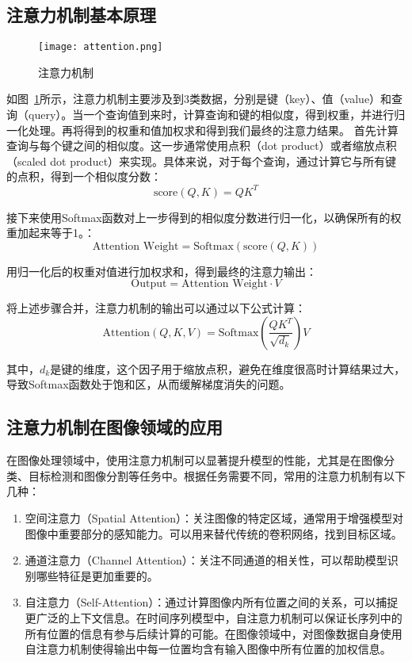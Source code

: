 \subsection{注意力机制基本原理}

\begin{figure}[h]
  \centering
  \texttt{[image: attention.png]}
  \caption{注意力机制}
  \label{fig:attention}
\end{figure}

如图~\ref{fig:attention}所示，注意力机制主要涉及到3类数据，分别是键（key）、值（value）和查询（query）。当一个查询值到来时，计算查询和键的相似度，得到权重，并进行归一化处理。再将得到的权重和值加权求和得到我们最终的注意力结果。
首先计算查询与每个键之间的相似度。这一步通常使用点积（dot product）或者缩放点积（scaled dot product）来实现。具体来说，对于每个查询，通过计算它与所有键的点积，得到一个相似度分数：
\begin{equation}
  \text{score}(Q, K) = QK^T 
\end{equation}

接下来使用Softmax函数对上一步得到的相似度分数进行归一化，以确保所有的权重加起来等于1。：
\begin{equation}
   \text{Attention Weight} = \text{Softmax}(\text{score}(Q, K))
\end{equation}

用归一化后的权重对值进行加权求和，得到最终的注意力输出：
\begin{equation}
  \text{Output} = \text{Attention Weight} \cdot V 
\end{equation}

将上述步骤合并，注意力机制的输出可以通过以下公式计算：
\begin{equation}
\text{Attention}(Q, K, V) = \text{Softmax}\left(\frac{QK^T}{\sqrt{d_k}}\right)V 
\end{equation}

其中，\(d_k\)是键的维度，这个因子用于缩放点积，避免在维度很高时计算结果过大，导致Softmax函数处于饱和区，从而缓解梯度消失的问题\cite{vaswani2017attention}。
\subsection{注意力机制在图像领域的应用}
在图像处理领域中，使用注意力机制可以显著提升模型的性能，尤其是在图像分类、目标检测和图像分割等任务中。根据任务需要不同，常用的注意力机制有以下几种：
\begin{enumerate}    
  \item 空间注意力（Spatial Attention）：关注图像的特定区域，通常用于增强模型对图像中重要部分的感知能力。可以用来替代传统的卷积网络，找到目标区域。
  \item 通道注意力（Channel Attention）：关注不同通道的相关性，可以帮助模型识别哪些特征是更加重要的。
  \item 自注意力（Self-Attention）：通过计算图像内所有位置之间的关系，可以捕捉更广泛的上下文信息。在时间序列模型中，自注意力机制可以保证长序列中的所有位置的信息有参与后续计算的可能。在图像领域中，对图像数据自身使用自注意力机制使得输出中每一位置均含有输入图像中所有位置的加权信息。
\end{enumerate}


